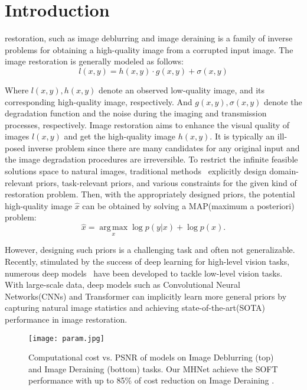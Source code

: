 \documentclass[lettersize,journal]{IEEEtran}
\begin{document}
\section{Introduction}
 restoration, such as image deblurring and image deraining is a family of inverse problems for obtaining a high-quality image from a corrupted input image. The image restoration is generally modeled as follows: 
\begin{equation}
	\label{equ:01}
	l(x,y)=h(x,y) \cdot g(x,y)+ \sigma(x,y)
\end{equation}

Where $l(x,y), h(x,y)$ denote an observed low-quality image, and its corresponding high-quality image, respectively. And $g(x,y), \sigma(x,y)$ denote the degradation function and the noise during the imaging and transmission processes, respectively.  Image restoration aims to enhance the visual quality of images $l(x,y)$ and get the high-quality image $h(x,y)$. It is typically an ill-posed inverse problem since there are many candidates for any original input and the image degradation procedures are irreversible. To restrict the infinite feasible solutions space to natural images, traditional methods~\cite{1992Nonlinear,  2002Scale, 2005Fields, 2011Image, 2011Single} explicitly design domain-relevant priors, task-relevant priors, and various constraints for the given kind of restoration problem. Then, with the appropriately designed priors, the potential high-quality image $\hat{x}$ can be obtained by solving a MAP(maximum a posteriori) problem:
\begin{equation}
	\label{equ:02}
	\hat{x}= \underset {x} { \operatorname {arg\,max}} \log p(y|x) + \log p(x).
\end{equation}

However, designing such priors is a challenging task and often not generalizable.  Recently, stimulated by the success of deep learning for high-level vision tasks, numerous deep models~\cite{dai2019second,2020Residual,Zamir2021MPRNet,Zamir2022MIRNetv2,chen2022simple,chu2022nafssr,Wang_2022_CVPR,Chen_2021_CVPR} have been developed to tackle low-level vision tasks. With large-scale data, deep models such as Convolutional Neural Networks(CNNs) and Transformer can implicitly learn more general priors by capturing natural image statistics and achieving state-of-the-art(SOTA) performance in image restoration.
\begin{figure}[t] \centering
	\texttt{[image: param.jpg]}
	\caption{Computational cost vs. PSNR of models on Image Deblurring (top) and Image Deraining (bottom) tasks. Our MHNet achieve the SOFT performance with up to 85\% of cost reduction on Image Deraining .}
	\label{fig:param}
\end{figure}
\end{document}

